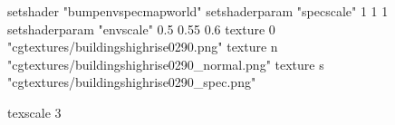 setshader "bumpenvspecmapworld"
setshaderparam "specscale" 1 1 1
setshaderparam "envscale"  0.5 0.55 0.6
   texture 0 "cgtextures/buildingshighrise0290.png"
   texture n "cgtextures/buildingshighrise0290_normal.png"
   texture s "cgtextures/buildingshighrise0290_spec.png"

texscale 3